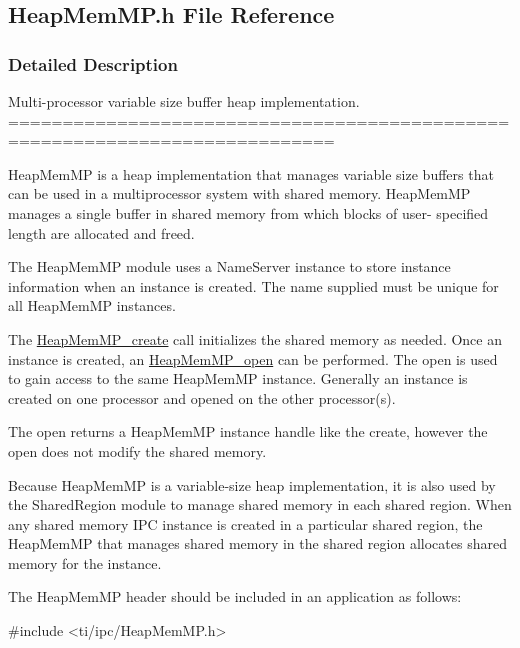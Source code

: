\subsection{HeapMemMP.h File Reference}
\label{_heap_mem_m_p_8h}


\subsubsection{Detailed Description}
Multi-\/processor variable size buffer heap implementation. ============================================================================

HeapMemMP is a heap implementation that manages variable size buffers that can be used in a multiprocessor system with shared memory. HeapMemMP manages a single buffer in shared memory from which blocks of user-\/ specified length are allocated and freed.

The HeapMemMP module uses a NameServer instance to store instance information when an instance is created. The name supplied must be unique for all HeapMemMP instances.

The \hyperlink{_heap_mem_m_p_8h_a3ee79b7e84e8eaef048c919be45e0a7c}{HeapMemMP\_\-create} call initializes the shared memory as needed. Once an instance is created, an \hyperlink{_heap_mem_m_p_8h_a05598b30cd1a93e88e59cea962d1e976}{HeapMemMP\_\-open} can be performed. The open is used to gain access to the same HeapMemMP instance. Generally an instance is created on one processor and opened on the other processor(s).

The open returns a HeapMemMP instance handle like the create, however the open does not modify the shared memory.

Because HeapMemMP is a variable-\/size heap implementation, it is also used by the SharedRegion module to manage shared memory in each shared region. When any shared memory IPC instance is created in a particular shared region, the HeapMemMP that manages shared memory in the shared region allocates shared memory for the instance.

The HeapMemMP header should be included in an application as follows: 
\begin{DoxyCode}
  #include <ti/ipc/HeapMemMP.h>
\end{DoxyCode}


